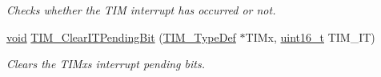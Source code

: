 \begin{DoxyCompactItemize}
\begin{DoxyCompactList}\small\item\em Checks whether the T\+IM interrupt has occurred or not. \end{DoxyCompactList}\item 
\hyperlink{usb__devapi_8h_afabf60e7f57651d6d595a02c75f07cd0}{void} \hyperlink{group___t_i_m___private___functions_ga9eb1e95af71ed380f51a2c6d585cc5d6}{T\+I\+M\+\_\+\+Clear\+I\+T\+Pending\+Bit} (\hyperlink{struct_t_i_m___type_def}{T\+I\+M\+\_\+\+Type\+Def} $\ast$T\+I\+Mx, \hyperlink{_p_e___types_8h_a1f1825b69244eb3ad2c7165ddc99c956}{uint16\+\_\+t} T\+I\+M\+\_\+\+IT)
\begin{DoxyCompactList}\small\item\em Clears the T\+I\+Mx\textquotesingle{}s interrupt pending bits. \end{DoxyCompactList}\end{DoxyCompactItemize}
